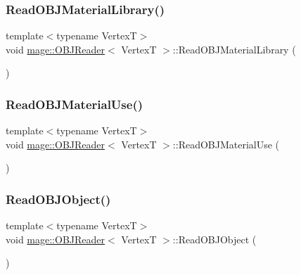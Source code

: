 \hypertarget{classmage_1_1_o_b_j_reader_abc1f67436e50230bd2071b2dc31a4689}{}\label{classmage_1_1_o_b_j_reader_abc1f67436e50230bd2071b2dc31a4689} 
\subsubsection{\texorpdfstring{Read\+O\+B\+J\+Material\+Library()}{ReadOBJMaterialLibrary()}}
{\footnotesize\ttfamily template$<$typename VertexT$>$ \\
void \hyperlink{classmage_1_1_o_b_j_reader}{mage\+::\+O\+B\+J\+Reader}$<$ VertexT $>$\+::Read\+O\+B\+J\+Material\+Library (\begin{DoxyParamCaption}{ }\end{DoxyParamCaption})\hspace{0.3cm}{\ttfamily [private]}}

\hypertarget{classmage_1_1_o_b_j_reader_aa4c73ff0e5e3de40cacbebc189037802}{}\label{classmage_1_1_o_b_j_reader_aa4c73ff0e5e3de40cacbebc189037802} 
\subsubsection{\texorpdfstring{Read\+O\+B\+J\+Material\+Use()}{ReadOBJMaterialUse()}}
{\footnotesize\ttfamily template$<$typename VertexT$>$ \\
void \hyperlink{classmage_1_1_o_b_j_reader}{mage\+::\+O\+B\+J\+Reader}$<$ VertexT $>$\+::Read\+O\+B\+J\+Material\+Use (\begin{DoxyParamCaption}{ }\end{DoxyParamCaption})\hspace{0.3cm}{\ttfamily [private]}}

\hypertarget{classmage_1_1_o_b_j_reader_afc3f17024a006cce3b7869ca8c6a8f07}{}\label{classmage_1_1_o_b_j_reader_afc3f17024a006cce3b7869ca8c6a8f07} 
\subsubsection{\texorpdfstring{Read\+O\+B\+J\+Object()}{ReadOBJObject()}}
{\footnotesize\ttfamily template$<$typename VertexT$>$ \\
void \hyperlink{classmage_1_1_o_b_j_reader}{mage\+::\+O\+B\+J\+Reader}$<$ VertexT $>$\+::Read\+O\+B\+J\+Object (\begin{DoxyParamCaption}{ }\end{DoxyParamCaption})\hspace{0.3cm}{\ttfamily [private]}}

